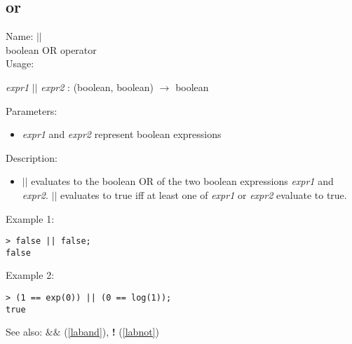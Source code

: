 \subsection{or}
\label{labor}
\noindent Name: \textbf{$||$}\\
boolean OR operator\\

\noindent Usage: 
\begin{center}
\emph{expr1} \textbf{$||$} \emph{expr2} : (\textsf{boolean}, \textsf{boolean}) $\rightarrow$ \textsf{boolean}\\
\end{center}
Parameters: 
\begin{itemize}
\item \emph{expr1} and \emph{expr2} represent boolean expressions
\end{itemize}
\noindent Description: \begin{itemize}

\item \textbf{$||$} evaluates to the boolean OR of the two
   boolean expressions \emph{expr1} and \emph{expr2}. \textbf{$||$} evaluates to 
   true iff at least one of \emph{expr1} or \emph{expr2} evaluate to true.
\end{itemize}
\noindent Example 1: 
\begin{center}\begin{minipage}{15cm}\begin{Verbatim}[frame=single]
> false || false;
false
\end{Verbatim}
\end{minipage}\end{center}
\noindent Example 2: 
\begin{center}\begin{minipage}{15cm}\begin{Verbatim}[frame=single]
> (1 == exp(0)) || (0 == log(1));
true
\end{Verbatim}
\end{minipage}\end{center}
See also: \textbf{$\&\&$} (\ref{laband}), \textbf{!} (\ref{labnot})
